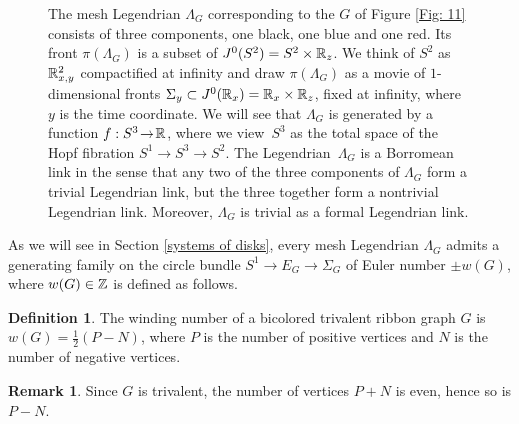 \documentclass[11pt]{article}
\newcommand{\smaller}{\small}
\numberwithin{equation}{section}\providecommand{\dpl}{\displaystyle}
\theoremstyle{plain}
\theoremstyle{definition}
\newtheorem{definition}[theorem]{Definition}
\newtheorem{remark}[theorem]{Remark}
\begin{document}
\begin{figure}[htbp]
\begin{center}
\caption{\smaller The mesh Legendrian $\Lambda_G$ corresponding to the $G$ of Figure \ref{Fig: 11} consists of three components, one black, one blue and one red. Its front $\pi(\Lambda_G)$ is a subset of $J^0(S^2)=S^2 \times \mathbb{R}_z$. We think of $S^2$ as $\mathbb{R}^2_{x,y}$ compactified at infinity and draw $\pi(\Lambda_G)$ as a movie of $1$-dimensional fronts $\Sigma_y \subset J^0(\mathbb{R}_x)=\mathbb{R}_x \times \mathbb{R}_z$, fixed at infinity, where $y$ is the time coordinate. We will see that $\Lambda_G$ is generated by a function $f:S^3\!\to\!\mathbb{R}$, where we view~$S^3$ as the total space of the Hopf fibration $S^1\!\to\!S^3\!\to\!S^2$. The Legendrian~$\Lambda_G$ is a Borromean link in the sense that any two of the three components of $\Lambda_G$ form a trivial Legendrian link, but the three together form a nontrivial Legendrian link. Moreover, $\Lambda_G$ is trivial as a formal Legendrian link.}
\label{Fig: start}
\end{center}
\end{figure}
%

As we will see in Section \ref{systems of disks}, every mesh Legendrian $\Lambda_G$ admits a generating family on the circle bundle $S^1 \to E_G \to \Sigma_G $ of Euler number $\pm w(G)$, where $w(G) \in \mathbb{Z}$ is defined as follows.

\begin{definition}
The winding number of a bicolored trivalent ribbon graph $G$ is $w(G) = \frac{1}{2}(P-N)$, where $P$ is the number of positive vertices and $N$ is the number of negative vertices.
\end{definition}

\begin{remark}
Since $G$ is trivalent, the number of vertices $P+N$ is even, hence so is $P - N$.
\end{remark}
\end{document}
